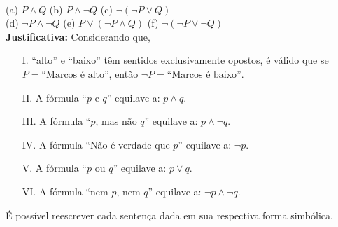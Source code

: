 \documentclass[12pt,letterpaper, onecolumn]{exam}
\begin{document}
\begin{questions}
    
    \begin{solution}                            \\[0.5em]
        (a) \( P \wedge Q \)                    \hfill
        (b) \( P \wedge \neg Q \)               \hfill
        (c) \( \neg ( \neg P \vee Q ) \)        \\[0.5em]
        (d) \( \neg P \wedge \neg Q \)          \hfill
        (e) \( P \vee ( \neg P \wedge Q ) \)    \hfill
        (f) \( \neg ( \neg P \vee \neg Q ) \)   \\[1em]
        \textbf{Justificativa:} Considerando que,
        \begin{itemize}
            \item[I.] “alto” e “baixo” têm sentidos exclusivamente opostos, é válido que se \( P = \text{“Marcos é alto”} \), então \( \neg P = \text{“Marcos é baixo”} \).
            \item[II.] A fórmula “\(p\) e \(q\)” equilave a: \( p \wedge q\).
            \item[III.] A fórmula “\(p\), mas não \(q\)” equilave a: \( p \wedge \neg q\).
            \item[IV.] A fórmula “Não é verdade que \(p\)” equilave a: \( \neg p \).
            \item[V.] A fórmula “\(p\) ou \(q\)” equilave a: \( p \vee q\).
            \item[VI.] A fórmula “nem \(p\), nem \(q\)” equilave a: \( \neg p \wedge \neg q \).
        \end{itemize}
        É possível reescrever cada sentença dada em sua respectiva forma simbólica. 
    \end{solution}


\end{questions}
\end{document}
